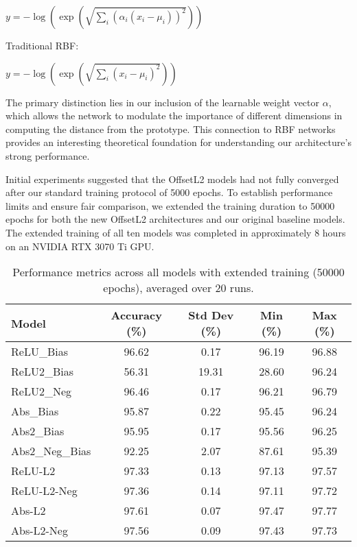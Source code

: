 $y = -\log(\exp(\sqrt{\sum_i (\alpha_i(x_i - \mu_i))^2}))$

Traditional RBF:

$y = -\log(\exp(\sqrt{\sum_i (x_i - \mu_i)^2}))$

The primary distinction lies in our inclusion of the learnable weight vector $\alpha$, which allows the network to modulate the importance of different dimensions in computing the distance from the prototype. This connection to RBF networks provides an interesting theoretical foundation for understanding our architecture's strong performance.

Initial experiments suggested that the OffsetL2 models had not fully converged after our standard training protocol of 5000 epochs. To establish performance limits and ensure fair comparison, we extended the training duration to 50000 epochs for both the new OffsetL2 architectures and our original baseline models. The extended training of all ten models was completed in approximately 8 hours on an NVIDIA RTX 3070 Ti GPU.

\begin{table}[ht]
    \centering
    \begin{tabular}{lcccc}
    \toprule
    \textbf{Model} & \textbf{Accuracy (\%)} & \textbf{Std Dev (\%)} & \textbf{Min (\%)} & \textbf{Max (\%)} \\
    \midrule
    ReLU\_Bias & 96.62 & 0.17 & 96.19 & 96.88 \\
    ReLU2\_Bias & 56.31 & 19.31 & 28.60 & 96.24 \\
    ReLU2\_Neg & 96.46 & 0.17 & 96.21 & 96.79 \\
    Abs\_Bias & 95.87 & 0.22 & 95.45 & 96.24 \\
    Abs2\_Bias & 95.95 & 0.17 & 95.56 & 96.25 \\
    Abs2\_Neg\_Bias & 92.25 & 2.07 & 87.61 & 95.39 \\
    \midrule
    ReLU-L2 & 97.33 & 0.13 & 97.13 & 97.57 \\
    ReLU-L2-Neg & 97.36 & 0.14 & 97.11 & 97.72 \\
    Abs-L2 & 97.61 & 0.07 & 97.47 & 97.77 \\
    Abs-L2-Neg & 97.56 & 0.09 & 97.43 & 97.73 \\
    \bottomrule
    \end{tabular}
    \caption{Performance metrics across all models with extended training (50000 epochs), averaged over 20 runs.}
    \label{tab:extended_training}
\end{table}

